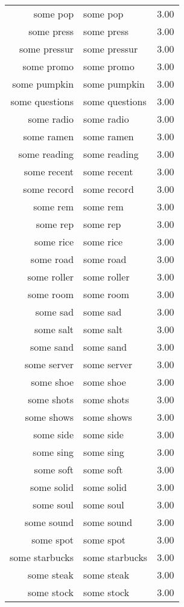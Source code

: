 \begin{table}[ht]
\begin{tabular}{rlr}
  some pop & some pop & 3.00 \\ 
  some press & some press & 3.00 \\ 
  some pressur & some pressur & 3.00 \\ 
  some promo & some promo & 3.00 \\ 
  some pumpkin & some pumpkin & 3.00 \\ 
  some questions & some questions & 3.00 \\ 
  some radio & some radio & 3.00 \\ 
  some ramen & some ramen & 3.00 \\ 
  some reading & some reading & 3.00 \\ 
  some recent & some recent & 3.00 \\ 
  some record & some record & 3.00 \\ 
  some rem & some rem & 3.00 \\ 
  some rep & some rep & 3.00 \\ 
  some rice & some rice & 3.00 \\ 
  some road & some road & 3.00 \\ 
  some roller & some roller & 3.00 \\ 
  some room & some room & 3.00 \\ 
  some sad & some sad & 3.00 \\ 
  some salt & some salt & 3.00 \\ 
  some sand & some sand & 3.00 \\ 
  some server & some server & 3.00 \\ 
  some shoe & some shoe & 3.00 \\ 
  some shots & some shots & 3.00 \\ 
  some shows & some shows & 3.00 \\ 
  some side & some side & 3.00 \\ 
  some sing & some sing & 3.00 \\ 
  some soft & some soft & 3.00 \\ 
  some solid & some solid & 3.00 \\ 
  some soul & some soul & 3.00 \\ 
  some sound & some sound & 3.00 \\ 
  some spot & some spot & 3.00 \\ 
  some starbucks & some starbucks & 3.00 \\ 
  some steak & some steak & 3.00 \\ 
  some stock & some stock & 3.00 \\ 

\end{tabular}
\end{table}
